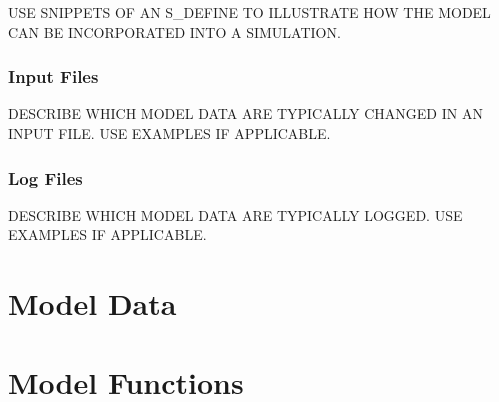 \documentclass[twoside,11pt,titlepage]{report}
\begin{document}
USE SNIPPETS OF AN S\_DEFINE TO ILLUSTRATE HOW THE MODEL
CAN BE INCORPORATED INTO A SIMULATION.

\subsection{Input Files}

DESCRIBE WHICH MODEL DATA ARE TYPICALLY CHANGED IN AN INPUT FILE.
USE EXAMPLES IF APPLICABLE.

\subsection{Log Files}

DESCRIBE WHICH MODEL DATA ARE TYPICALLY LOGGED.
USE EXAMPLES IF APPLICABLE.

\newpage
{}



\newpage
{}
\appendix

\chapter{Model Data}\label{sec:model_data}

%


\chapter{Model Functions}\label{sec:model_functions}

%
\end{document}

